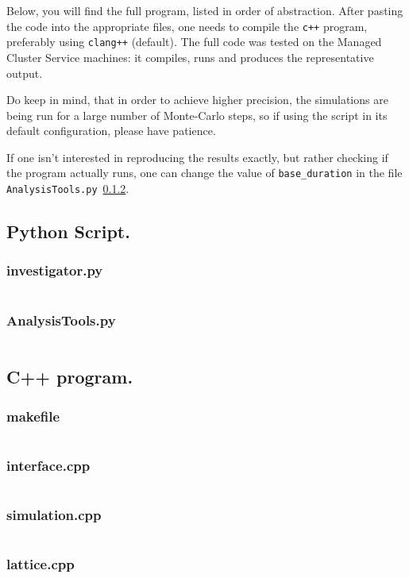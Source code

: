 \documentclass[12pt]{article}
\begin{document}
Below, you will find the full program, listed in order of abstraction. After pasting the code into the appropriate files, one needs to compile the \texttt{c++} program, preferably using \texttt{clang++} (default). The full code was tested on the Managed Cluster Service machines: it compiles, runs and produces the representative output.

Do keep in mind, that in order to achieve higher precision, the simulations are being run for a large number of Monte-Carlo steps, so if using the script in its default configuration, please have patience.

If one isn't interested in reproducing the results exactly, but rather checking if the program actually runs, one can change the value of \texttt{base\_duration} in the file \texttt{AnalysisTools.py}~\ref{sec:an_tools}.
\subsection{Python Script.}
\subsubsection{investigator.py}\label{sec:investigator}
\inputminted{python}{investigator.py}
\subsubsection{AnalysisTools.py}\label{sec:an_tools}
\inputminted{python}{AnalysisTools.py}
\subsection{C++ program.}
\subsubsection{makefile}\label{sec:makefile}
\inputminted{makefile}{makefile}
\subsubsection{interface.cpp}\label{sec:interface}
\inputminted{c++}{interface.cpp}
\subsubsection{simulation.cpp}\label{sec:simulation}
\inputminted{c++}{simulation.cpp}
\subsubsection{lattice.cpp}\label{sec:lattice}
\inputminted{c++}{lattice.cpp}
\end{document}

